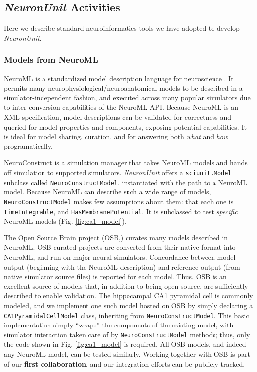 \documentclass[11pt,letterpaper]{article}
\let\verbx\lstinline
\begin{document}
\subsection{\textit{NeuronUnit} Activities}
\label{sec:neuronunit_acitivities}
Here we describe standard neuroinformatics tools we have adopted to develop \textit{NeuronUnit}\cite{neurounit_url}.  

\subsubsection{Models from NeuroML}\label{sec:neuroml_models}
NeuroML is a standardized model description language for neuroscience \cite{gleeson_neuroml:_2010}. It permits many neurophysiological/neuroanatomical models to be described in a simulator-independent fashion, and executed across many popular simulators due to inter-conversion capabilities of the NeuroML API.  Because NeuroML is an XML specification, model descriptions can be validated for correctness and queried for model properties and components, exposing potential capabilities.  It is ideal for model sharing, curation, and for answering both \textit{what} and \textit{how} programatically.  

NeuroConstruct\cite{neuroconstruct_url,gleeson_neuroconstruct:_2007} is a simulation manager that takes NeuroML models and hands off simulation to supported simulators. \textit{NeuronUnit} offers a \verbx{sciunit.Model} subclass called \verbx{NeuroConstructModel}, instantiated with the path to a NeuroML model.  Because NeuroML can describe such a wide range of models, \verbx{NeuroConstructModel} makes few assumptions about them: that each one is \verbx{TimeIntegrable}, and \verbx{HasMembranePotential}.  It is subclassed to test \textit{specific} NeuroML models (Fig. \ref{fig:ca1_model}). 

The Open Source Brain project (OSB,\cite{osb_url}) curates many models described in NeuroML. OSB-curated projects are converted from their native format into NeuroML, and run on major neural simulators\cite{neuron_url,genesis_url,nest_url,moose_url}. Concordance between model output (beginning with the NeuroML description) and reference output (from native simulator source files) is reported for each model.  Thus, OSB is an excellent source of models that, in addition to being open source, are sufficiently described to enable validation.   The hippocampal CA1 pyramidal cell is commonly modeled, and we implement one such model hosted on OSB\cite{osb_ca1_url} by simply declaring a \verbx{CA1PyramidalCellModel} class, inheriting from \verbx{NeuroConstructModel}.  This basic implementation simply ``wraps'' the components of the existing model, with simulator interaction taken care of by \verbx{NeuroConstructModel} methods; thus, only the code shown in Fig. \ref{fig:ca1_model} is required.  All OSB models, and indeed any NeuroML model, can be tested similarly.  Working together with OSB is part of our \textbf{first collaboration}, and our integration efforts can be publicly tracked\cite{neuroconstruct_rgerkin_url}.  
\end{document}
